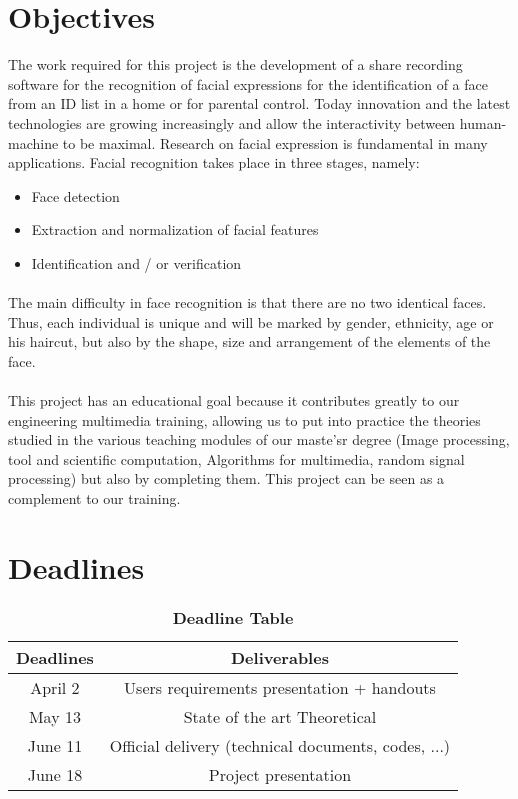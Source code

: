 \clearpage


\section{Objectives }
The work required for this project is the development of a share recording software for the recognition of facial expressions for the identification of a face from an ID list in a home or for parental control.
Today innovation and the latest technologies are growing increasingly and allow the interactivity between human-machine to be maximal. Research  on facial expression is fundamental in many applications.
Facial recognition takes place in three stages, namely:
\begin{itemize}
\item Face detection
\item Extraction and normalization of facial features
\item Identification and / or verification
\end{itemize}
\paragraph{}
The main difficulty in face recognition is that  there are no two identical faces. Thus, each individual is unique and will be marked by gender, ethnicity, age or his haircut, but also by the shape, size and arrangement of the elements of the face.
\paragraph{}
This project has an educational goal because it contributes greatly to our engineering multimedia training, allowing us to put into practice the theories studied in the various teaching modules of our maste’sr degree (Image processing, tool and scientific computation, Algorithms for multimedia, random signal processing) but also by completing them. This project can be seen as a complement to our training.



\section{Deadlines}

 \begin{table}[!ht]%
\begin{center}
\begin{tabular}{|c|c|}
  \hline
  Deadlines & Deliverables  \\
  \hline
  \scriptsize{April 2} & Users requirements presentation + handouts \\
   \hline
  \scriptsize{May 13} & State of the art Theoretical \\
   \hline
  \scriptsize{June 11} & Official delivery (technical documents, codes, ...)\\
   \hline
  \scriptsize{June 18} & Project presentation\\
   \hline
   
\end{tabular}
\end{center}
\caption{\textbf{Deadline Table}}
\label{tab1}
\end{table}


